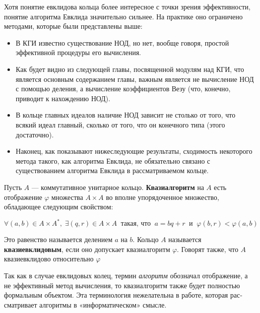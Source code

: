 Хотя понятие евклидова кольца более интересное с точки зрения
эффективности, понятие алгоритма Евклида значительно сильнее. На
практике оно ограничено методами, которые были представлены выше:
\begin{itemize}


\item В КГИ известно существование НОД, но нет, вообще говоря, простой эффективной процедуры его вычисления.

\item Как будет видно из следующей главы, посвященной модулям над
КГИ, что является основным содержанием главы, важным явля­ется не вычисление НОД с помощью деления, а вычисление коэф­фициентов Везу (что, конечно, приводит к нахождению НОД).

\item В кольце главных идеалов наличие НОД зависит не столько от то­го, что всякий идеал главный, сколько от того, что он конечного
типа (этого достаточно).
\newpage
\item Наконец, как показывают нижеследующие результаты, сходи­мость некоторого метода такого, как алгоритма Евклида, не обязательно связано с существованием алгоритма Евклида в рассма­триваемом кольце.
\end{itemize}
\begin{determ}
\hspace*{0.5cm}
Пусть $A$ — коммутативное унитарное кольцо. \textbf{Квазиалгоритм} на $A$ есть отображение $\varphi$ множества $A\times A$ во вполне упорядоченное множество, обладающее следующим свойством:
\begin{center}
$\forall(a,b)\in A\times A^*,\; \exists(q,r)\in A\times A\;\;\text{такая, что}\;\;a = bq + r\;\;\text{и}\;\;\varphi(b,r)<\varphi(a,b)$
\end{center}
Это равенство называется делением $a$ на $b$. Кольцо $A$ называется \textbf{квазиевклидовым}, если оно допускает квазиалгоритм $\varphi$. Говорят также, что $A$ квазиевклидово относительно $\varphi$
\end{determ}
\begin{mynote}
Так как в случае евклидовых колец, термин \textit{алгоритм} обозначал отображение, а не эффективный метод вычисления, то квазиалгоритм также будет полностью формальным объектом. Эта терминология нежелательна в работе, которая рас­сматривает алгоритмы в «информатическом» смысле.
\end{mynote}

